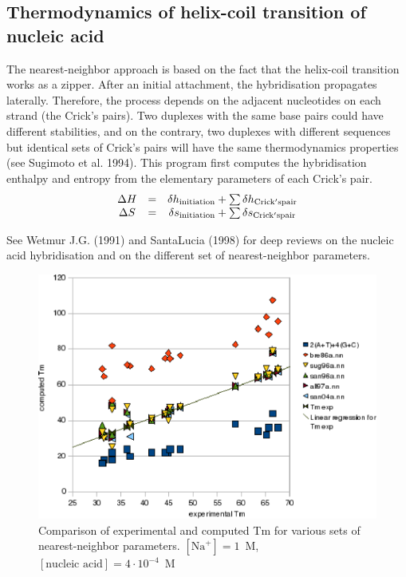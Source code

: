 \documentclass{article}
\begin{document}
\subsection{Thermodynamics of helix-coil transition of nucleic acid}  
The nearest-neighbor approach is based on the fact that the helix-coil
transition works as a zipper. After an initial attachment, the hybridisation
propagates laterally.  Therefore, the process depends on the adjacent
nucleotides on each strand (the Crick's pairs).  Two duplexes with the same base
pairs could have different stabilities, and on the contrary, two duplexes with
different sequences but identical sets of Crick's pairs will have the same
thermodynamics properties (see Sugimoto et al. 1994).  This program first
computes the hybridisation enthalpy and entropy from the elementary parameters
of each Crick's pair.
\begin{displaymath}
  \begin{array}[t]{ccc}
  \Delta{}H&=&\delta{}h_\mathrm{initiation}+\sum \delta{}h_\mathrm{Crick's pair}\\
  \Delta{}S&=&\delta{}s_\mathrm{initiation}+\sum \delta{}s_\mathrm{Crick's pair}
  \end{array}
\end{displaymath}
   
See Wetmur J.G. (1991) and SantaLucia (1998) 
for deep reviews on the nucleic  acid hybridisation and on the different 
set of nearest-neighbor parameters.    

\begin{figure}[h]
\includegraphics{image1M.eps}
\caption{Comparison of experimental and computed Tm for various sets of
  nearest-neighbor parameters. $[\mbox{Na}^+] = 1$~M, $[\mbox{nucleic acid}] = 4\cdot{}10^{-4}$~M}
\end{figure}
\end{document}
